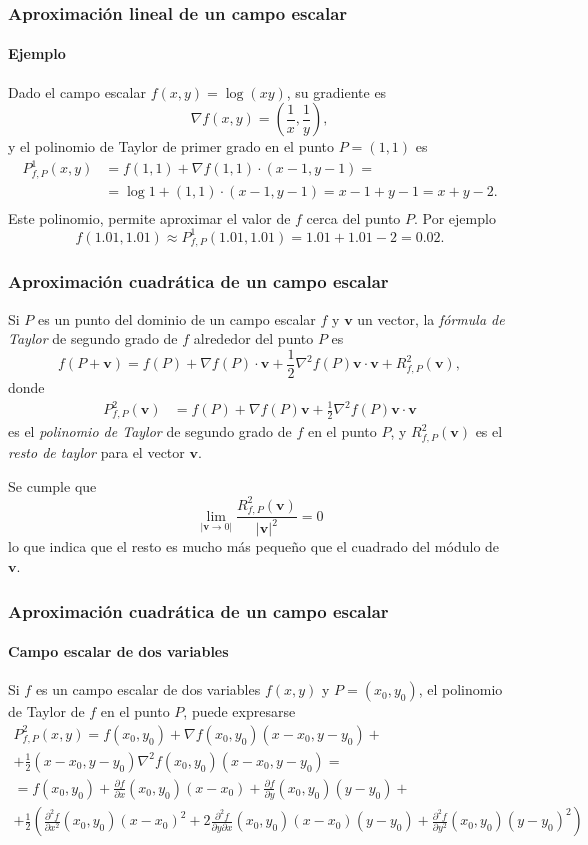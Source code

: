 \begin{frame}
\frametitle{Aproximación lineal de un campo escalar}
\framesubtitle{Ejemplo}
Dado el campo escalar $f(x,y)=\log(xy)$, su gradiente es
\[
\nabla f(x,y) = \left(\frac{1}{x},\frac{1}{y}\right),
\]
y el polinomio de Taylor de primer grado en el punto $P=(1,1)$ es
\begin{align*}
P^1_{f,P}(x,y) &= f(1,1) +\nabla f(1,1)\cdot (x-1,y-1) = \\
&= \log 1+(1,1)\cdot(x-1,y-1) = x-1+y-1 = x+y-2.\\
\end{align*}
Este polinomio, permite aproximar el valor de $f$ cerca del punto $P$.
Por ejemplo
\[ 
f(1.01,1.01) \approx P^1_{f,P}(1.01,1.01) = 1.01+1.01-2 = 0.02.
\]
\end{frame}


\begin{frame}
\frametitle{Aproximación cuadrática de un campo escalar}
Si $P$ es un punto del dominio de un campo escalar $f$ y $\mathbf{v}$ un vector, la \emph{fórmula de Taylor} de segundo
grado de $f$ alrededor del punto $P$ es
\[
f(P+\mathbf{v}) = f(P) + \nabla f(P)\cdot \mathbf{v} + \frac{1}{2}\nabla^2f(P)\mathbf{v}\cdot\mathbf{v} + R^2_{f,P}(\mathbf{v}),
\]
donde 
\begin{align*}
P^2_{f,P}(\mathbf{v})&=f(P)+\nabla f(P)\mathbf{v}+\frac{1}{2}\nabla^2f(P)\mathbf{v}\cdot\mathbf{v}
\end{align*}
es el \emph{polinomio de Taylor} de segundo grado de $f$ en el punto $P$, y $R^2_{f,P}(\mathbf{v})$ es el \emph{resto de taylor} para el vector $\mathbf{v}$.

Se cumple que  
\[
\lim_{|\mathbf{v}\rightarrow 0|} \frac{R^2_{f,P}(\mathbf{v})}{|\mathbf{v}|^2} = 0
\]
lo que indica que el resto es mucho más pequeño que el cuadrado del módulo de $\mathbf{v}$.
\end{frame}


\begin{frame}
\frametitle{Aproximación cuadrática de un campo escalar}
\framesubtitle{Campo escalar de dos variables}
Si $f$ es un campo escalar de dos variables $f(x,y)$ y $P=(x_0,y_0)$, el polinomio de Taylor de $f$ en el punto $P$, puede expresarse
\begin{multline*}
P^2_{f,P}(x,y) = f(x_0,y_0)+\nabla f(x_0,y_0)(x-x_0,y-y_0) +\\
+\frac{1}{2}(x-x_0,y-y_0)\nabla^2f(x_0,y_0)(x-x_0,y-y_0)= \\
= f(x_0,y_0)+\frac{\partial f}{\partial x}(x_0,y_0)(x-x_0)+\frac{\partial f}{\partial y}(x_0,y_0)(y-y_0)+\\
+\frac{1}{2}\left(\frac{\partial^2 f}{\partial x^2}(x_0,y_0) (x-x_0)^2 + 2\frac{\partial^2 f}{\partial y\partial x}(x_0,y_0) (x-x_0)(y-y_0) + \frac{\partial^2 f}{\partial y^2}(x_0,y_0) (y-y_0)^2\right)
\end{multline*}
\end{frame}


